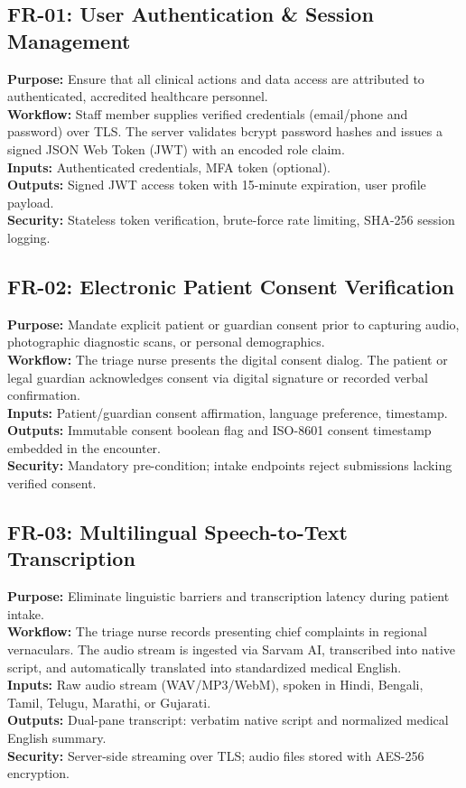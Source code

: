 \documentclass[11pt,a4paper,oneside]{report}
\begin{document}
\subsection{FR-01: User Authentication \& Session Management}
\textbf{Purpose:} Ensure that all clinical actions and data access are attributed to authenticated, accredited healthcare personnel.\\
\textbf{Workflow:} Staff member supplies verified credentials (email/phone and password) over TLS. The server validates bcrypt password hashes and issues a signed JSON Web Token (JWT) with an encoded role claim.\\
\textbf{Inputs:} Authenticated credentials, MFA token (optional).\\
\textbf{Outputs:} Signed JWT access token with 15-minute expiration, user profile payload.\\
\textbf{Security:} Stateless token verification, brute-force rate limiting, SHA-256 session logging.

\subsection{FR-02: Electronic Patient Consent Verification}
\textbf{Purpose:} Mandate explicit patient or guardian consent prior to capturing audio, photographic diagnostic scans, or personal demographics.\\
\textbf{Workflow:} The triage nurse presents the digital consent dialog. The patient or legal guardian acknowledges consent via digital signature or recorded verbal confirmation.\\
\textbf{Inputs:} Patient/guardian consent affirmation, language preference, timestamp.\\
\textbf{Outputs:} Immutable consent boolean flag and ISO-8601 consent timestamp embedded in the encounter.\\
\textbf{Security:} Mandatory pre-condition; intake endpoints reject submissions lacking verified consent.

\subsection{FR-03: Multilingual Speech-to-Text Transcription}
\textbf{Purpose:} Eliminate linguistic barriers and transcription latency during patient intake.\\
\textbf{Workflow:} The triage nurse records presenting chief complaints in regional vernaculars. The audio stream is ingested via Sarvam AI, transcribed into native script, and automatically translated into standardized medical English.\\
\textbf{Inputs:} Raw audio stream (WAV/MP3/WebM), spoken in Hindi, Bengali, Tamil, Telugu, Marathi, or Gujarati.\\
\textbf{Outputs:} Dual-pane transcript: verbatim native script and normalized medical English summary.\\
\textbf{Security:} Server-side streaming over TLS; audio files stored with AES-256 encryption.
\end{document}

